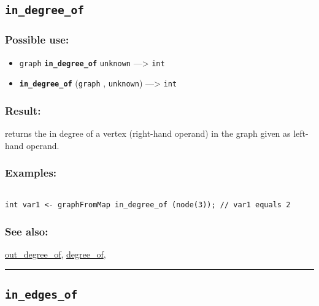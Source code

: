 \documentclass[]{book}
\providecommand{\tightlist}{%
  \setlength{\itemsep}{0pt}\setlength{\parskip}{0pt}}
\theoremstyle{definition}
\theoremstyle{definition}
\theoremstyle{definition}
\theoremstyle{remark}
\begin{document}
\subsection{\texorpdfstring{\texttt{in\_degree\_of}}{in\_degree\_of}}\label{in_degree_of}

\subsubsection{Possible use:}\label{possible-use-267}

\begin{itemize}
\tightlist
\item
  \texttt{graph} \textbf{\texttt{in\_degree\_of}} \texttt{unknown}
  ---\textgreater{} \texttt{int}
\item
  \textbf{\texttt{in\_degree\_of}} (\texttt{graph} , \texttt{unknown})
  ---\textgreater{} \texttt{int}
\end{itemize}

\subsubsection{Result:}\label{result-257}

returns the in degree of a vertex (right-hand operand) in the graph
given as left-hand operand.

\subsubsection{Examples:}\label{examples-205}

\begin{verbatim}
 
int var1 <- graphFromMap in_degree_of (node(3)); // var1 equals 2
\end{verbatim}

\subsubsection{See also:}\label{see-also-115}

\href{OperatorsNR\#out_degree_of}{out\_degree\_of},
\href{OperatorsDH\#degree_of}{degree\_of},

\begin{center}\rule{0.5\linewidth}{\linethickness}\end{center}

\subsection{\texorpdfstring{\texttt{in\_edges\_of}}{in\_edges\_of}}\label{in_edges_of}
\end{document}

